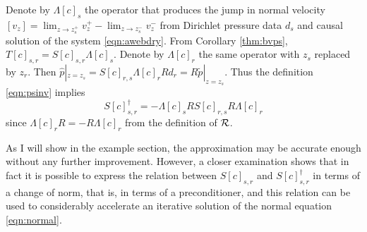 Denote by $\Lambda[c]_s$ the operator that produces the jump in normal velocity $[v_z]=\lim_{z \rightarrow z_s^+}v_z^+ - \lim_{z\rightarrow z_s^-} v_z^-$ from Dirichlet pressure data $d_s$ and causal solution of the system \ref{eqn:awebdry}. From Corollary \ref{thm:bvps}, $T[c]_{s,r} = S[c]_{s,r}\Lambda[c]_s$. Denote by $\Lambda[c]_r$ the same operator with $z_s$ replaced by $z_r$. Then $\hat{p}|_{z=z_s} = S[c]_{r,s}\Lambda[c]_rRd_r=R\tilde{p}|_{z=z_s}$. Thus the definition \ref{eqn:psinv} implies
\begin{equation}
\label{eqn:psinvrev}
S[c]_{s,r}^{\dagger}= -\Lambda[c]_sRS[c]_{r,s}R\Lambda[c]_r
\end{equation}
since $\Lambda[c]_rR=-R\Lambda[c]_r$ from the definition of ${\cal R}$.

As I will show in the example section, the approximation may be accurate enough without any further improvement. However, a closer examination shows that in fact it is possible to express the relation between $S[c]_{s,r}$ and $S[c]_{s,r}^{\dagger}$ in terms of a change of norm, that is, in terms of a preconditioner, and this relation can be used to considerably accelerate an iterative solution of the normal equation \ref{eqn:normal}. 

